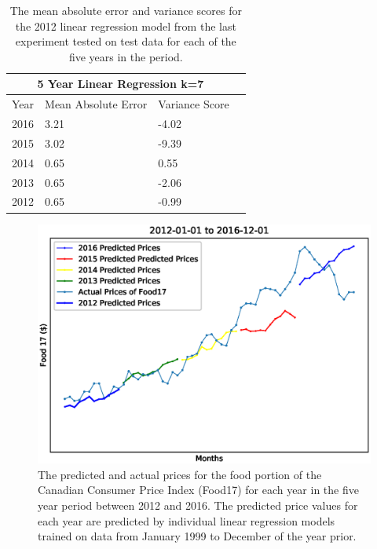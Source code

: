 \documentclass[12pt]{dalthesis}
\begin{document}
\begin{table}
	\caption{The mean absolute error and variance scores for the 2012 linear regression model from the last experiment tested on test data for each of the five years in the period. }
	\label{tab:5yearson2012}
    \begin{tabular}{ |p{4cm}||p{4cm}|p{4cm}|p{4cm}|  }
       \hline
       \multicolumn{3}{|c|}{5 Year Linear Regression k=7} \\
       \hline
       Year    & Mean Absolute Error    & Variance Score \\
       \hline
       2016    & 3.21    & -4.02\\
       2015    & 3.02    & -9.39\\
       2014    & 0.65    & 0.55\\
       2013    & 0.65    & -2.06\\
       2012    & 0.65    & -0.99\\
       \hline
    \end{tabular}
\end{table}

\begin{figure}
	\includegraphics[width=\columnwidth]{5year}
    \caption{The predicted and actual prices for the food portion of the Canadian Consumer Price Index (Food17) for each year in the five year period between 2012 and 2016. The predicted price values for each year are predicted by individual linear regression models trained on data from January 1999 to December of the year prior.}
    \label{fig:5yeargraph}
\end{figure}
\end{document}
